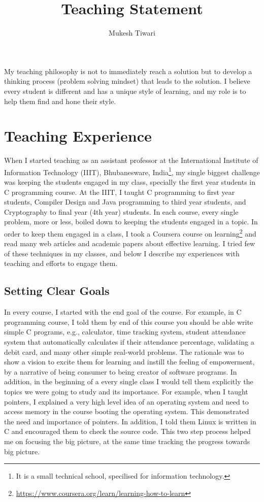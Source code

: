 \documentclass[a4paper]{article}
\title{Teaching Statement}
\author{Mukesh Tiwari}
\begin{document}
\fontsize{12}{15}
\selectfont
\maketitle


My teaching philosophy is not to immediately reach a solution but to develop a 
thinking process (problem solving mindset) that leads to the solution. I believe every 
student is different and has a unique style of learning, and my role is to help them find 
and hone their style.

\section{Teaching Experience}
When I started teaching as an assistant professor at the International Institute of Information 
Technology (IIIT), Bhubanesware, India\footnote{It is a small technical school, 
specilised for information technology.},
my single biggest challenge was keeping the students engaged in my class, specially the first year 
students in C programming course. At the IIIT, I taught C programming to 
first year students, Compiler Design and Java programming to third year students, and
Cryptography to final year (4th year) students. In each course, every single 
problem,  more or less, boiled down to keeping the students engaged in a topic. 
In order to keep them engaged in a class, I took a Coursera course on 
learning\footnote{\url{https://www.coursera.org/learn/learning-how-to-learn}} and 
read many web articles and academic papers about effective learning.
I tried few of these techniques in my classes, and below I 
describe my experiences with teaching and efforts to engage them. 





\subsection{Setting Clear Goals}
In every course, I started with the end goal of the course. For example, 
in C programming course, I told them by end of this course you should be 
able write simple C programs, e.g., calculator, time tracking system,
student attendance system that automatically calculates if their attendance percentage, 
validating a debit card, and many other simple real-world problems. The rationale was 
to show a vision to excite them 
for learning and instill the feeling of empowerment, by a narrative of 
being consumer to being creator of software programs.
In addition, in the beginning of a every single class 
I would tell them explicitly the topics we were going to study and 
its importance. For example, when I taught pointers, I explained a 
very high level idea of an operating system and need to access memory 
in the course booting the operating system. This demonstrated the 
need and importance of pointers. In addition, I told them
Linux is written in C and encouraged them to check the source code.
This two step process helped me on focusing the big picture, 
at the same time tracking the progress towards big picture.
\end{document}
